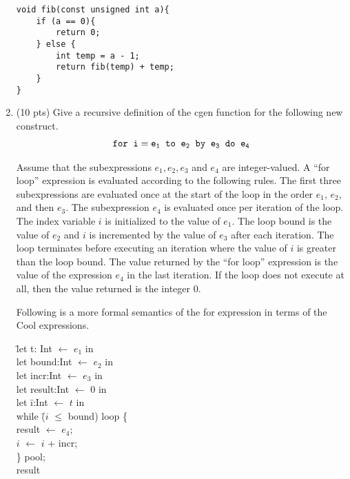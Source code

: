\documentclass[10pt]{article}
\begin{document}
\begin{enumerate}
\begin{lstlisting}
void fib(const unsigned int a){
    if (a == 0){
        return 0;
    } else {
        int temp = a - 1;
        return fib(temp) + temp;
    }
}
\end{lstlisting}

\pagebreak

\item (10 pts) Give a recursive definition of the cgen function for the following new construct.
\begin{eqnarray*}
\tt{for}\;\; i = e_1 \;\;to\;\; e_2 \;\;\tt{by}\;\; e_3 \;\;\tt{do }\;\; e_4
\end{eqnarray*}

Assume that the subexpressions $e_1, e_2, e_3$ and $e_4$ are
integer-valued. A ``for loop'' expression is evaluated according to
the following rules. The first three subexpressions are evaluated once
at the start of the loop in the order $e_1$, $e_2$, and then $e_3$.
The subexpression $e_4$ is evaluated once per iteration of the loop.
The index variable $i$ is initialized to the value of $e_1$.
The loop bound is the value of $e_2$ and $i$ is incremented by the
value of $e_3$ after each iteration. The loop terminates before
executing an iteration where the value of $i$ is greater than the
loop bound. The value returned by the ``for loop'' expression is the value of the
expression $e_4$ in the last iteration. If the loop does not execute
at all, then the value returned is the integer $0$.

Following is a more formal semantics of the for expression in terms of the Cool
expressions.
\begin{tabbing}
  \hspace*{3mm} \= let t: Int $\leftarrow$ $e_1$ in \\
  \> let bound:Int  $\leftarrow$ $e_2$ in \\
  \> let incr:Int  $\leftarrow$ $e_3$ in \\
  \> let result:Int  $\leftarrow$ $0$ in \\
  \> let \= i:Int $\leftarrow$ $t$ in   \\
   \>  \> while \= ($i$ $\leq$ bound) loop \{ \\
     \>\>\>   result $\leftarrow$ $e_4$; \\
\> \> \> $i$ $\leftarrow$ $i$ + incr; \\
     \> \> \} pool; \\
     \> \> result  \\
\end{tabbing}


\end{enumerate}
\end{document}
